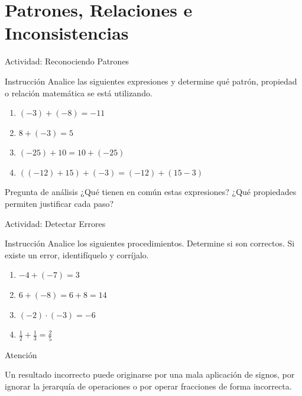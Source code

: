 \documentclass[aspectratio=169,10pt]{beamer}
\newcommand{\AlertaPedagogica}[1]{
	\begin{alertblock}{Atención}
		#1
	\end{alertblock}
}
\begin{document}
	\section{Patrones, Relaciones e Inconsistencias}
	
	\begin{frame}{Actividad: Reconociendo Patrones}
		\begin{block}{Instrucción}
			Analice las siguientes expresiones y determine qué patrón, propiedad o relación matemática se está utilizando.
		\end{block}
		
		\begin{enumerate}[<+->]
			\item \((-3)+(-8)=-11\)
			\item \(8+(-3)=5\)
			\item \((-25)+10=10+(-25)\)
			\item \(((-12)+15)+(-3)=(-12)+(15-3)\)
		\end{enumerate}
		
		\begin{alertblock}{Pregunta de análisis}
			¿Qué tienen en común estas expresiones? ¿Qué propiedades permiten justificar cada paso?
		\end{alertblock}
	\end{frame}
	
	\begin{frame}{Actividad: Detectar Errores}
		\begin{block}{Instrucción}
			Analice los siguientes procedimientos. Determine si son correctos. Si existe un error, identifíquelo y corríjalo.
		\end{block}
		
		\begin{enumerate}[<+->]
			\item \(-4+(-7)=3\)
			\item \(6+(-8)=6+8=14\)
			\item \((-2)\cdot(-3)=-6\)
			\item \(\frac12+\frac13=\frac25\)
		\end{enumerate}
		
		\AlertaPedagogica{
			Un resultado incorrecto puede originarse por una mala aplicación de signos, por ignorar la jerarquía de operaciones o por operar fracciones de forma incorrecta.
		}
	\end{frame}
	
\end{document}
